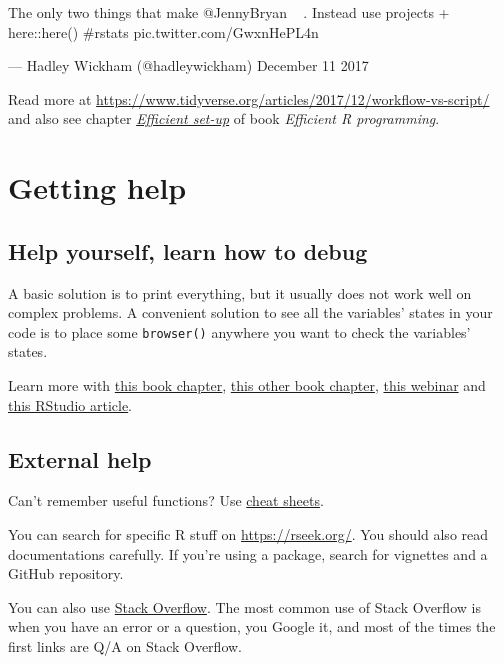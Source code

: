 \documentclass[]{book}
\theoremstyle{definition}
\theoremstyle{definition}
\theoremstyle{definition}
\theoremstyle{remark}
\begin{document}
The only two things that make @JennyBryan 😤😠🤯. Instead use projects +
here::here() \#rstats pic.twitter.com/GwxnHePL4n

--- Hadley Wickham (@hadleywickham) December 11 2017

Read more at
\url{https://www.tidyverse.org/articles/2017/12/workflow-vs-script/} and
also see chapter
\href{https://bookdown.org/csgillespie/efficientR/set-up.html}{\emph{Efficient
set-up}} of book \emph{Efficient R programming}.

\section{Getting help}\label{getting-help}

\subsection{Help yourself, learn how to
debug}\label{help-yourself-learn-how-to-debug}

A basic solution is to print everything, but it usually does not work
well on complex problems. A convenient solution to see all the
variables' states in your code is to place some \texttt{browser()}
anywhere you want to check the variables' states.

Learn more with
\href{https://bookdown.org/rdpeng/rprogdatascience/debugging.html}{this
book chapter},
\href{http://adv-r.had.co.nz/Exceptions-Debugging.html}{this other book
chapter},
\href{https://www.rstudio.com/resources/videos/debugging-techniques-in-rstudio/}{this
webinar} and
\href{https://support.rstudio.com/hc/en-us/articles/205612627-Debugging-with-RStudio}{this
RStudio article}.

\subsection{External help}\label{external-help}

Can't remember useful functions? Use
\href{https://www.rstudio.com/resources/cheatsheets/}{cheat sheets}.

You can search for specific R stuff on \url{https://rseek.org/}. You
should also read documentations carefully. If you're using a package,
search for vignettes and a GitHub repository.

You can also use \href{https://stackoverflow.com/}{Stack Overflow}. The
most common use of Stack Overflow is when you have an error or a
question, you Google it, and most of the times the first links are Q/A
on Stack Overflow.
\end{document}
